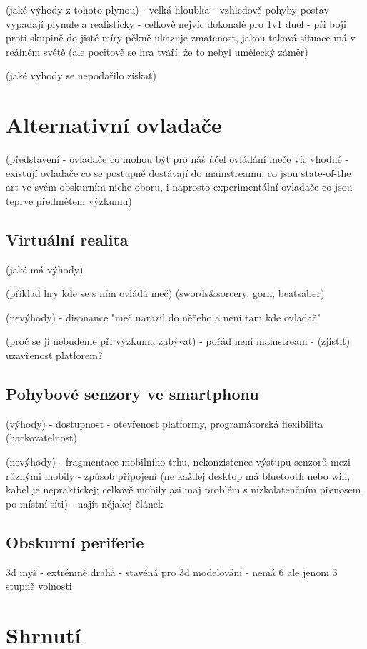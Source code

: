 (jaké výhody z tohoto plynou)
- velká hloubka
- vzhledově pohyby postav vypadají plynule a realisticky
- celkově nejvíc dokonalé pro 1v1 duel
- při boji proti skupině do jisté míry pěkně ukazuje zmatenost, jakou taková situace má v reálném světě (ale pocitově se hra tváří, že to nebyl umělecký záměr)


(jaké výhody se nepodařilo získat)


\section{Alternativní ovladače}

(představení - ovladače co mohou být pro náš účel ovládání meče víc vhodné - existují ovladače co se postupně dostávají do mainstreamu, co jsou state-of-the art ve svém obskurním niche oboru, i naprosto experimentální ovladače co jsou teprve předmětem výzkumu)

\subsection{Virtuální realita}

(jaké má výhody)

(příklad hry kde se s ním ovládá meč) (swords\&sorcery, gorn, beatsaber)

(nevýhody)
- disonance "meč narazil do něčeho a není tam kde ovladač"

(proč se jí nebudeme při výzkumu zabývat)
- pořád není mainstream
- (zjistit) uzavřenost platforem?


\subsection{Pohybové senzory ve smartphonu}

(výhody)
- dostupnost
- otevřenost platformy, programátorská flexibilita (hackovatelnost)

(nevýhody)
- fragmentace mobilního trhu, nekonzistence výstupu senzorů mezi různými mobily
- způsob připojení (ne každej desktop má bluetooth nebo wifi, kabel je nepraktickej; celkově mobily asi maj problém s nízkolatenčním přenosem po místní síti)
- najít nějakej článek

\subsection{Obskurní periferie}

3d myš
- extrémně drahá 
- stavěná pro 3d modelováni
- nemá 6 ale jenom 3 stupně volnosti


\section{Shrnutí}

